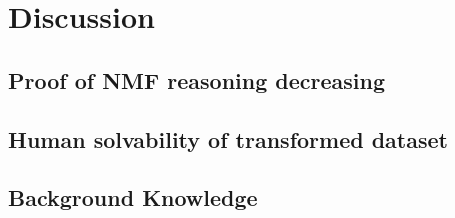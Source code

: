 \section{Discussion}

\subsection{Proof of NMF reasoning decreasing}

\subsection{Human solvability of transformed dataset}

\subsection{Background Knowledge}